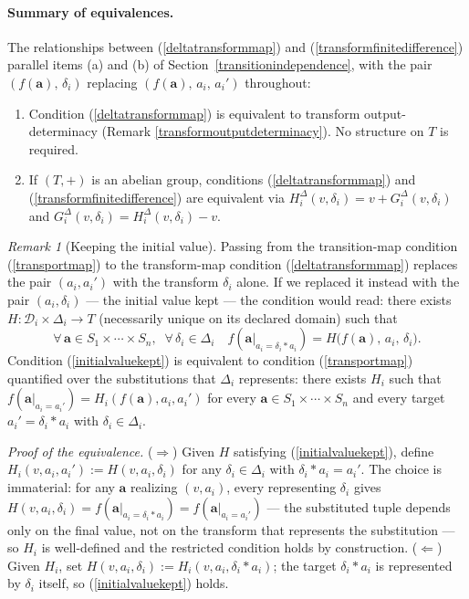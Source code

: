 \documentclass{article}
\theoremstyle{definition}
\theoremstyle{remark}
\newtheorem{remark}[proposition]{Remark}
\begin{document}
\paragraph{Summary of equivalences.} The relationships between (\ref{deltatransformmap}) and (\ref{transformfinitedifference}) parallel items (a) and (b) of Section~\ref{transitionindependence}, with the pair $(f(\boldsymbol{a}),\, \delta_i)$ replacing $(f(\boldsymbol{a}),\, a_i,\, a_i')$ throughout:
\begin{enumerate}[label=(\alph*)]
\item Condition (\ref{deltatransformmap}) is equivalent to transform output-determinacy (Remark \ref{transformoutputdeterminacy}). No structure on $T$ is required.
\item If $(T, +)$ is an abelian group, conditions (\ref{deltatransformmap}) and (\ref{transformfinitedifference}) are equivalent via $H_i^\Delta(v, \delta_i) = v + G_i^\Delta(v, \delta_i)$ and $G_i^\Delta(v, \delta_i) = H_i^\Delta(v, \delta_i) - v$.
\end{enumerate}

\begin{remark}[Keeping the initial value]
\label{keepinitialvalue}
Passing from the transition-map condition (\ref{transportmap}) to the transform-map condition (\ref{deltatransformmap}) replaces the pair $(a_i, a_i')$ with the transform $\delta_i$ alone. If we replaced it instead with the pair $(a_i, \delta_i)$ --- the initial value kept --- the condition would read: there exists $H \colon \mathcal{D}_i \times \Delta_i \to T$ (necessarily unique on its declared domain) such that
\begin{equation}
\label{initialvaluekept}
\forall\, \boldsymbol{a} \in S_1 \times \cdots \times S_n,\;\; \forall\, \delta_i \in \Delta_i \quad
f(\boldsymbol{a}|_{a_i = \delta_i \ast a_i}) = H\bigl(f(\boldsymbol{a}),\, a_i,\, \delta_i\bigr).
\end{equation}
Condition (\ref{initialvaluekept}) is equivalent to condition (\ref{transportmap}) quantified over the substitutions that $\Delta_i$ represents: there exists $H_i$ such that $f(\boldsymbol{a}|_{a_i = a_i'}) = H_i(f(\boldsymbol{a}), a_i, a_i')$ for every $\boldsymbol{a} \in S_1 \times \cdots \times S_n$ and every target $a_i' = \delta_i \ast a_i$ with $\delta_i \in \Delta_i$.
\end{remark}

\noindent \textit{Proof of the equivalence.} ($\Rightarrow$) Given $H$ satisfying (\ref{initialvaluekept}), define $H_i(v, a_i, a_i') := H(v, a_i, \delta_i)$ for any $\delta_i \in \Delta_i$ with $\delta_i \ast a_i = a_i'$. The choice is immaterial: for any $\boldsymbol{a}$ realizing $(v, a_i)$, every representing $\delta_i$ gives $H(v, a_i, \delta_i) = f(\boldsymbol{a}|_{a_i = \delta_i \ast a_i}) = f(\boldsymbol{a}|_{a_i = a_i'})$ --- the substituted tuple depends only on the final value, not on the transform that represents the substitution --- so $H_i$ is well-defined and the restricted condition holds by construction. ($\Leftarrow$) Given $H_i$, set $H(v, a_i, \delta_i) := H_i(v, a_i, \delta_i \ast a_i)$; the target $\delta_i \ast a_i$ is represented by $\delta_i$ itself, so (\ref{initialvaluekept}) holds.
\end{document}
